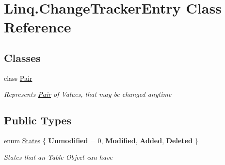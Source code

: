 \hypertarget{class_linq_1_1_change_tracker_entry}{}\section{Linq.\+Change\+Tracker\+Entry Class Reference}
\label{class_linq_1_1_change_tracker_entry}
\subsection*{Classes}
\begin{DoxyCompactItemize}
\item 
class \mbox{\hyperlink{class_linq_1_1_change_tracker_entry_1_1_pair}{Pair}}
\begin{DoxyCompactList}\small\item\em Represents \mbox{\hyperlink{class_linq_1_1_change_tracker_entry_1_1_pair}{Pair}} of Values, that may be changed anytime \end{DoxyCompactList}\end{DoxyCompactItemize}
\subsection*{Public Types}
\begin{DoxyCompactItemize}
\item 
enum \mbox{\hyperlink{class_linq_1_1_change_tracker_entry_aded3f97a3bd1326ae1b264c7618b7828}{States}} \{ {\bfseries Unmodified} = 0, 
{\bfseries Modified}, 
{\bfseries Added}, 
{\bfseries Deleted}
 \}
\begin{DoxyCompactList}\small\item\em States that an Table-\/\+Object can have \end{DoxyCompactList}\end{DoxyCompactItemize}
